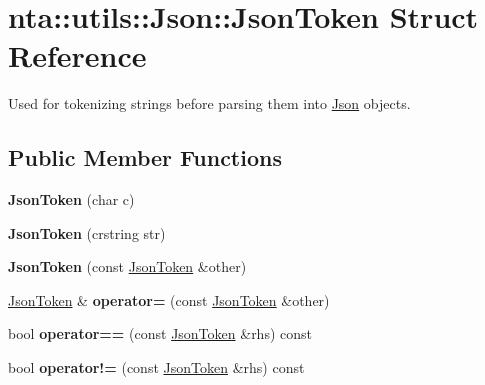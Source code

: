 \hypertarget{structnta_1_1utils_1_1Json_1_1JsonToken}{}\section{nta\+:\+:utils\+:\+:Json\+:\+:Json\+Token Struct Reference}
\label{structnta_1_1utils_1_1Json_1_1JsonToken}


Used for tokenizing strings before parsing them into \hyperlink{classnta_1_1utils_1_1Json}{Json} objects.  


\subsection*{Public Member Functions}
\begin{DoxyCompactItemize}
\item 
\mbox{\label{structnta_1_1utils_1_1Json_1_1JsonToken_a92c89581d01b1bcb9e020455b26d3357}} 
{\bfseries Json\+Token} (char c)
\item 
\mbox{\label{structnta_1_1utils_1_1Json_1_1JsonToken_af7f642d246c7ed4ef6c8b49505da3ed7}} 
{\bfseries Json\+Token} (crstring str)
\item 
\mbox{\label{structnta_1_1utils_1_1Json_1_1JsonToken_a4c3b2c9fd0aef1f4b64a50c97044fb16}} 
{\bfseries Json\+Token} (const \hyperlink{structnta_1_1utils_1_1Json_1_1JsonToken}{Json\+Token} \&other)
\item 
\mbox{\label{structnta_1_1utils_1_1Json_1_1JsonToken_abbe6a2f4ad86b45cc89e7f6c1930719f}} 
\hyperlink{structnta_1_1utils_1_1Json_1_1JsonToken}{Json\+Token} \& {\bfseries operator=} (const \hyperlink{structnta_1_1utils_1_1Json_1_1JsonToken}{Json\+Token} \&other)
\item 
\mbox{\label{structnta_1_1utils_1_1Json_1_1JsonToken_aaa56bd1310c36cb4a8180079ac9fe627}} 
bool {\bfseries operator==} (const \hyperlink{structnta_1_1utils_1_1Json_1_1JsonToken}{Json\+Token} \&rhs) const
\item 
\mbox{\label{structnta_1_1utils_1_1Json_1_1JsonToken_ae225afc2fbb368fe808b8ed527181a40}} 
bool {\bfseries operator!=} (const \hyperlink{structnta_1_1utils_1_1Json_1_1JsonToken}{Json\+Token} \&rhs) const
\end{DoxyCompactItemize}
